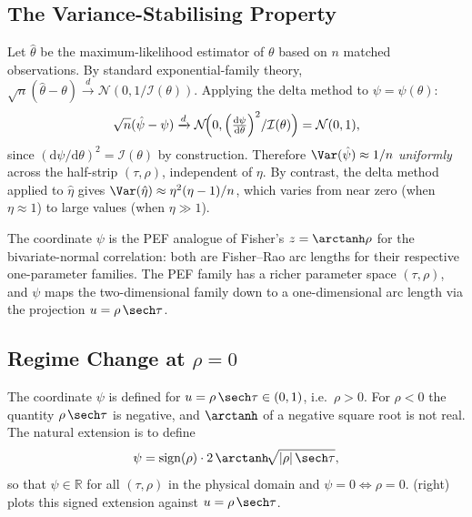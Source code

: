 \subsection{The Variance-Stabilising Property}
\label{sec:psi_var}

Let $\hat\theta$ be the maximum-likelihood estimator of $\theta$ based on $n$ matched observations.  By standard exponential-family theory, $\sqrt{n}(\hat\theta - \theta)\xrightarrow{d}\mathcal{N}(0,1/\mathcal{I}(\theta))$.  Applying the delta method to $\psi = \psi(\theta)$:
\begin{equation}
  \sqrt{n}(\hat\psi - \psi)
  \xrightarrow{d}
  \mathcal{N}\!\Bigl(0,\Bigl(\tfrac{\mathrm{d}\psi}{\mathrm{d}\theta}\Bigr)^{2}/\mathcal{I}(\theta)\Bigr)
  = \mathcal{N}(0,1),
  \label{eq:psi_clt}
\end{equation}
since $(\mathrm{d}\psi/\mathrm{d}\theta)^{2} = \mathcal{I}(\theta)$ by construction.  Therefore $\Var(\hat\psi) \approx 1/n$ \emph{uniformly} across the half-strip $(\tau,\rho)$, independent of $\eta$.  By contrast, the delta method applied to $\hat\eta$ gives $\Var(\hat\eta) \approx \eta^{2}(\eta-1)/n$, which varies from near zero (when $\eta \approx 1$) to large values (when $\eta \gg 1$).

\begin{remark}
The coordinate $\psi$ is the PEF analogue of Fisher's $z = \arctanh\rho$ \parencite{fisher1921} for the bivariate-normal correlation: both are Fisher--Rao arc lengths \parencite{amari2016} for their respective one-parameter families.  The PEF family has a richer parameter space $(\tau,\rho)$, and $\psi$ maps the two-dimensional family down to a one-dimensional arc length via the projection $u = \rho\,\sech\tau$.
\end{remark}

\subsection{Regime Change at \texorpdfstring{$\rho = 0$}{rho = 0}}
\label{sec:psi_regime}

The coordinate $\psi$ is defined for $u = \rho\,\sech\tau \in (0,1)$, i.e.\ $\rho > 0$.  For $\rho < 0$ the quantity $\rho\,\sech\tau$ is negative, and $\arctanh$ of a negative square root is not real.  The natural extension is to define
\begin{equation}
  \psi = \operatorname{sign}(\rho)\cdot 2\,\arctanh\!\sqrt{|\rho|\,\sech\tau},
  \label{eq:psi_signed}
\end{equation}
so that $\psi \in \mathbb{R}$ for all $(\tau,\rho)$ in the physical domain and $\psi = 0 \Leftrightarrow \rho = 0$.   (right) plots this signed extension against $u=\rho\,\sech\tau$.


